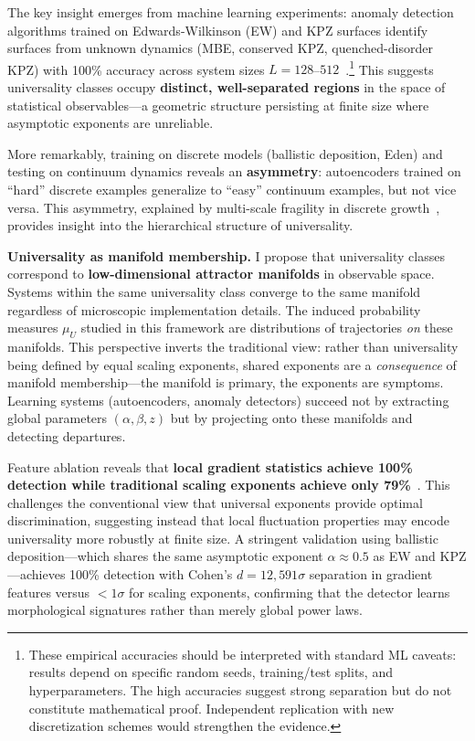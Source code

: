 \documentclass[aps,pre,reprint,amsmath,amssymb,superscriptaddress]{revtex4-2}
\begin{document}
The key insight emerges from machine learning experiments: anomaly detection algorithms trained on Edwards-Wilkinson (EW) and KPZ surfaces identify surfaces from unknown dynamics (MBE, conserved KPZ, quenched-disorder KPZ) with 100\% accuracy across system sizes $L = 128$--$512$~\cite{Bentley2026}.\footnote{These empirical accuracies should be interpreted with standard ML caveats: results depend on specific random seeds, training/test splits, and hyperparameters. The high accuracies suggest strong separation but do not constitute mathematical proof. Independent replication with new discretization schemes would strengthen the evidence.} This suggests universality classes occupy \textbf{distinct, well-separated regions} in the space of statistical observables---a geometric structure persisting at finite size where asymptotic exponents are unreliable.

More remarkably, training on discrete models (ballistic deposition, Eden) and testing on continuum dynamics reveals an \textbf{asymmetry}: autoencoders trained on ``hard'' discrete examples generalize to ``easy'' continuum examples, but not vice versa. This asymmetry, explained by multi-scale fragility in discrete growth~\cite{HAL2016}, provides insight into the hierarchical structure of universality.

\textbf{Universality as manifold membership.} I propose that universality classes correspond to \textbf{low-dimensional attractor manifolds} in observable space. Systems within the same universality class converge to the same manifold regardless of microscopic implementation details. The induced probability measures $\mu_U$ studied in this framework are distributions of trajectories \textit{on} these manifolds. This perspective inverts the traditional view: rather than universality being defined by equal scaling exponents, shared exponents are a \textit{consequence} of manifold membership---the manifold is primary, the exponents are symptoms. Learning systems (autoencoders, anomaly detectors) succeed not by extracting global parameters $(\alpha, \beta, z)$ but by projecting onto these manifolds and detecting departures.

Feature ablation reveals that \textbf{local gradient statistics achieve 100\% detection while traditional scaling exponents achieve only 79\%}~\cite{Bentley2026}. This challenges the conventional view that universal exponents provide optimal discrimination, suggesting instead that local fluctuation properties may encode universality more robustly at finite size. A stringent validation using ballistic deposition---which shares the same asymptotic exponent $\alpha \approx 0.5$ as EW and KPZ---achieves 100\% detection with Cohen's $d = 12{,}591\sigma$ separation in gradient features versus $<1\sigma$ for scaling exponents, confirming that the detector learns morphological signatures rather than merely global power laws.
\end{document}
